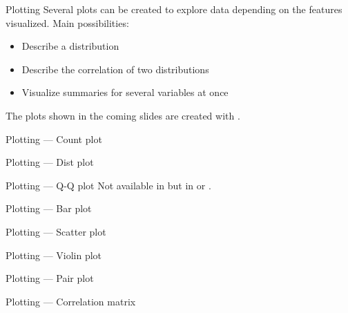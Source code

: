 \begin{frame}{Plotting}
  Several plots can be created to explore data depending on the features visualized. Main possibilities:

  \begin{itemize}
  \item Describe a distribution
  \item Describe the correlation of two distributions
  \item Visualize summaries for several variables at once
  \end{itemize}
  The plots shown in the coming slides are created with
  .
\end{frame}

\begin{frame}{Plotting — Count plot}
\end{frame}

\begin{frame}{Plotting — Dist plot}
\end{frame}

\begin{frame}{Plotting — Q-Q plot}
  Not available in 
  but in
  or
  .
\end{frame}

\begin{frame}{Plotting — Bar plot}
\end{frame}

\begin{frame}{Plotting — Scatter plot}
\end{frame}

\begin{frame}{Plotting — Violin plot}
\end{frame}

\begin{frame}{Plotting — Pair plot}
\end{frame}

\begin{frame}{Plotting — Correlation matrix}
\end{frame}

